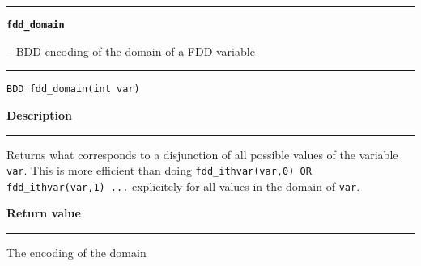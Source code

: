 \vspace{8ex}
\begin{minipage}{\textwidth}

\noindent\begin{minipage}{\textwidth}
\rule{\textwidth}{0.5mm}
{\tt\bf fdd\_domain }
\--- BDD encoding of the domain of a FDD variable  \hspace{\fill}
\\\rule[1.5ex]{\textwidth}{0.5mm}
\end{minipage}

\noindent\begin{verbatim}
BDD fdd_domain(int var) 
\end{verbatim}

\vspace{\parsep}\noindent
{\bf Description}\\\rule[1.5ex]{\textwidth}{0.2mm}\vspace{-1.5ex}\setlength{\parindent}{1em}
Returns what corresponds to a disjunction of all possible
           values of the variable  {\tt var}.
	   This is more efficient than doing
	   {\tt fdd\_ithvar(var,0) OR fdd\_ithvar(var,1) ...} explicitely
	   for all values in the domain of {\tt var}. 

\setlength{\parindent}{0em}\vspace{\parsep}\vspace{\baselineskip}\noindent
{\bf Return value}\\\rule[1.5ex]{\textwidth}{0.2mm}\vspace{-1.5ex}
The encoding of the domain
\end{minipage}
\vspace{8ex}
